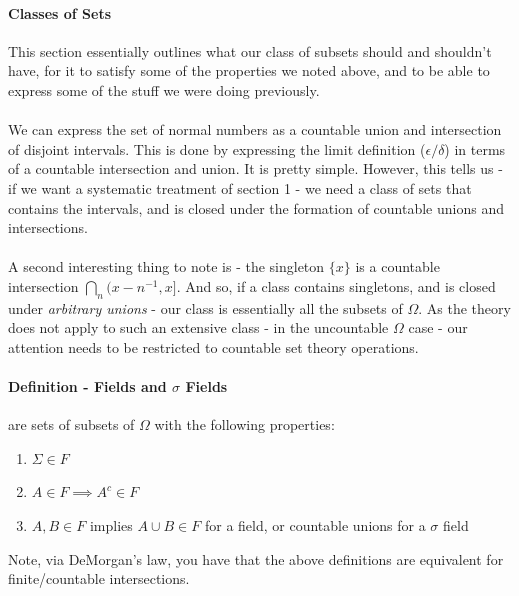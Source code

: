 \documentclass[12pt,a4paper]{article}
\newcommand{\1}[1]{\mathbbm{1}\left\{ #1 \right\}}
\begin{document}
\paragraph{Classes of Sets} This section essentially outlines what our class of subsets should and shouldn't have, for it to satisfy some of the properties we noted above, and to be able to express some of the stuff we were doing previously.
\\\\
We can express the set of normal numbers as a countable union and intersection of disjoint intervals. This is done by expressing the limit definition ($\epsilon/\delta$) in terms of a countable intersection and union. It is pretty simple. However, this tells us - if we want a systematic treatment of section 1 - we need a class of sets that contains the intervals, and is closed under the formation of countable unions and intersections.
\\\\
A second interesting thing to note is - the singleton $\{x\}$ is a countable intersection $\bigcap_n (x-n^{-1},x]$. And so, if a class contains singletons, and is closed under \textit{arbitrary unions} - our class is essentially all the subsets of $\Omega$. As the theory does not apply to such an extensive class - in the uncountable $\Omega$ case - our attention needs to be restricted to countable set theory operations.

\paragraph{Definition - Fields and $\sigma$ Fields} are sets of subsets of $\Omega$ with the following properties:
\begin{enumerate}
	\item $\Sigma \in F$
	\item $A \in F \implies A^c \in F$
	\item $A,B \in F$ implies $A \cup B \in F$ for a field, or countable unions for a $\sigma$ field
\end{enumerate}
Note, via DeMorgan's law, you have that the above definitions are equivalent for finite/countable intersections.
\end{document}
